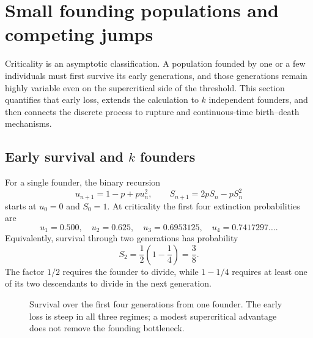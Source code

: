\section{Small founding populations and competing jumps}
\label{sec:small-populations}

Criticality is an asymptotic classification.  A population founded by one or a few
individuals must first survive its early generations, and those generations remain
highly variable even on the supercritical side of the threshold.  This section
quantifies that early loss, extends the calculation to \(k\) independent founders,
and then connects the discrete process to rupture and continuous-time birth--death
mechanisms.

\subsection{Early survival and \texorpdfstring{\(k\)}{k} founders}
\label{sec:k-founders}

For a single founder, the binary recursion
\begin{equation}
  u_{n+1}=1-p+pu_n^2,
  \qquad
  S_{n+1}=2pS_n-pS_n^2
  \label{eq:early-survival-recursions}
\end{equation}
starts at \(u_0=0\) and \(S_0=1\).  At criticality the first four extinction
probabilities are
\begin{equation}
  u_1=0.500,
  \quad u_2=0.625,
  \quad u_3=0.6953125,
  \quad u_4=0.7417297\ldots.
  \label{eq:early-critical-u}
\end{equation}
Equivalently, survival through two generations has probability
\begin{equation}
  S_2=\frac12\left(1-\frac14\right)=\frac38.
  \label{eq:two-generation-survival}
\end{equation}
The factor \(1/2\) requires the founder to divide, while \(1-1/4\) requires at least
one of its two descendants to divide in the next generation.

\begin{figure}[htbp]
\centering
{}
\caption{Survival over the first four generations from one founder.  The early
loss is steep in all three regimes; a modest supercritical advantage does not remove
the founding bottleneck.}
\label{fig:early-survival}
\end{figure}

